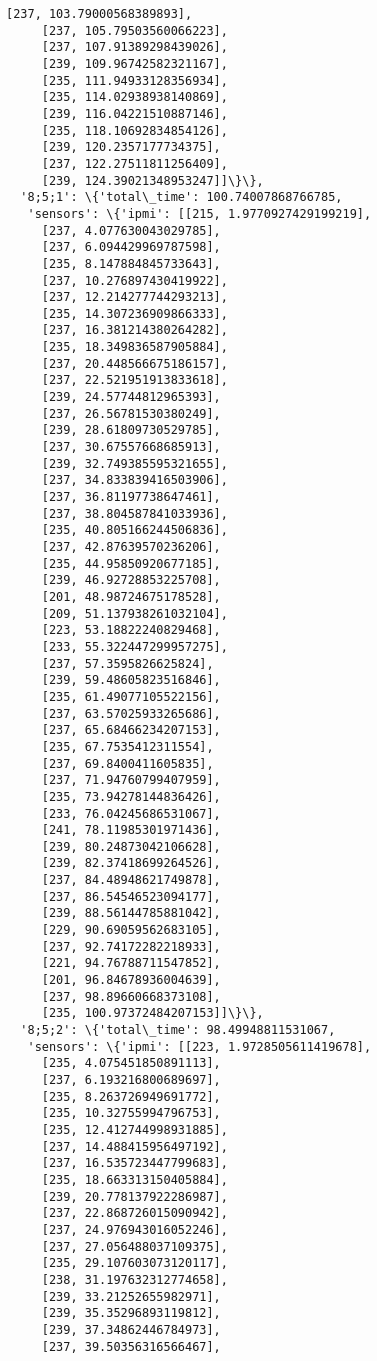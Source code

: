 \documentclass[11pt]{article}
\begin{document}
\begin{tcolorbox}[breakable, size=fbox, boxrule=.5pt, pad at break*=1mm, opacityfill=0]
\begin{Verbatim}[commandchars=\\\{\}]
     [237, 103.79000568389893],
     [237, 105.79503560066223],
     [237, 107.91389298439026],
     [239, 109.96742582321167],
     [235, 111.94933128356934],
     [235, 114.02938938140869],
     [239, 116.04221510887146],
     [235, 118.10692834854126],
     [239, 120.2357177734375],
     [237, 122.27511811256409],
     [239, 124.39021348953247]]\}\},
  '8;5;1': \{'total\_time': 100.74007868766785,
   'sensors': \{'ipmi': [[215, 1.9770927429199219],
     [237, 4.077630043029785],
     [237, 6.094429969787598],
     [235, 8.147884845733643],
     [237, 10.276897430419922],
     [237, 12.214277744293213],
     [235, 14.307236909866333],
     [237, 16.381214380264282],
     [235, 18.349836587905884],
     [237, 20.448566675186157],
     [237, 22.521951913833618],
     [239, 24.57744812965393],
     [237, 26.56781530380249],
     [239, 28.61809730529785],
     [237, 30.67557668685913],
     [239, 32.749385595321655],
     [237, 34.833839416503906],
     [237, 36.81197738647461],
     [237, 38.804587841033936],
     [235, 40.805166244506836],
     [237, 42.87639570236206],
     [235, 44.95850920677185],
     [239, 46.92728853225708],
     [201, 48.98724675178528],
     [209, 51.137938261032104],
     [223, 53.18822240829468],
     [233, 55.322447299957275],
     [237, 57.3595826625824],
     [239, 59.48605823516846],
     [235, 61.49077105522156],
     [237, 63.57025933265686],
     [237, 65.68466234207153],
     [235, 67.7535412311554],
     [237, 69.8400411605835],
     [237, 71.94760799407959],
     [235, 73.94278144836426],
     [233, 76.04245686531067],
     [241, 78.11985301971436],
     [239, 80.24873042106628],
     [239, 82.37418699264526],
     [237, 84.48948621749878],
     [237, 86.54546523094177],
     [239, 88.56144785881042],
     [229, 90.69059562683105],
     [237, 92.74172282218933],
     [221, 94.76788711547852],
     [201, 96.84678936004639],
     [237, 98.89660668373108],
     [235, 100.97372484207153]]\}\},
  '8;5;2': \{'total\_time': 98.49948811531067,
   'sensors': \{'ipmi': [[223, 1.9728505611419678],
     [235, 4.075451850891113],
     [237, 6.193216800689697],
     [235, 8.263726949691772],
     [235, 10.32755994796753],
     [235, 12.412744998931885],
     [237, 14.488415956497192],
     [237, 16.535723447799683],
     [235, 18.663313150405884],
     [239, 20.778137922286987],
     [237, 22.868726015090942],
     [237, 24.976943016052246],
     [237, 27.056488037109375],
     [235, 29.107603073120117],
     [238, 31.197632312774658],
     [239, 33.21252655982971],
     [239, 35.35296893119812],
     [239, 37.34862446784973],
     [237, 39.50356316566467],

\end{Verbatim}
\end{tcolorbox}
\end{document}
